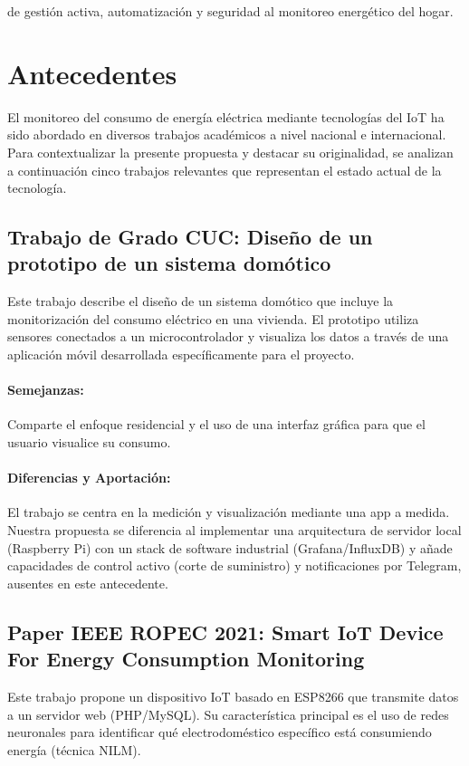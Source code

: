 de gestión activa, automatización y seguridad al monitoreo energético del hogar. \newpage

\section{Antecedentes}

    El monitoreo del consumo de energía eléctrica mediante tecnologías del IoT ha sido abordado en diversos trabajos académicos a nivel nacional e internacional. Para contextualizar la presente propuesta y destacar su originalidad, se analizan a continuación cinco trabajos relevantes que representan el estado actual de la tecnología. \subsection{Trabajo de Grado CUC: Diseño de un prototipo de un sistema domótico} Este trabajo describe el diseño de un sistema domótico que incluye la monitorización del consumo eléctrico en una vivienda. El prototipo utiliza sensores conectados a un microcontrolador y visualiza los datos a través de una aplicación móvil desarrollada específicamente para el proyecto. \cite{AhumadaBarros2021} 

        \paragraph{Semejanzas:} Comparte el enfoque residencial y el uso de una interfaz gráfica para que el usuario visualice su consumo.
        \paragraph{Diferencias y Aportación:} El trabajo se centra en la medición y visualización mediante una app a medida.
        Nuestra propuesta se diferencia al implementar una arquitectura de servidor local (Raspberry Pi) con un stack de software industrial (Grafana/InfluxDB) y añade capacidades de control activo (corte de suministro) y notificaciones por Telegram, ausentes en este antecedente.
    \subsection{Paper IEEE ROPEC 2021: Smart IoT Device For Energy Consumption Monitoring}
    Este trabajo propone un dispositivo IoT basado en ESP8266 que transmite datos a un servidor web (PHP/MySQL).
    Su característica principal es el uso de redes neuronales para identificar qué electrodoméstico específico está consumiendo energía (técnica NILM).
    \cite{LopezAlfaro2021}

